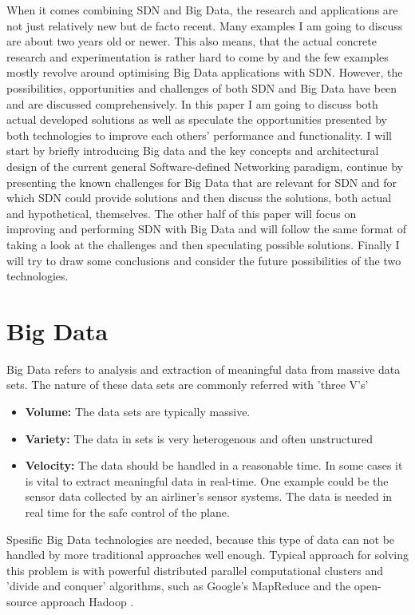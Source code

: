 \documentclass{acm_proc_article-sp}
\begin{document}
When it comes combining SDN and Big Data, the research and applications are not just relatively new but de facto recent. Many examples I am going to discuss are about two years old or newer. This also means, that the actual concrete research and experimentation is rather hard to come by and the few examples mostly revolve around optimising Big Data applications with SDN. However, the possibilities, opportunities and challenges of both SDN and Big Data have been and are discussed comprehensively. In this paper I am going to discuss both actual developed solutions as well as speculate the opportunities presented by both technologies to improve each others' performance and functionality. I will start by briefly introducing Big data and the key concepts and architectural design of the current general Software-defined Networking paradigm, continue by presenting the known challenges for Big Data that are relevant for SDN and for which SDN could provide solutions and then discuss the solutions, both actual and hypothetical, themselves. The other half of this paper will focus on improving and performing SDN with Big Data and will follow the same format of taking a look at the challenges and then speculating possible solutions. Finally I will try to draw some conclusions and consider the future possibilities of the two technologies. 

\section{Big Data}

Big Data refers to analysis and extraction of meaningful data from massive data sets. The nature of these data sets are commonly referred with 'three V's' \cite{Benjamins:2014:BDH:2611040.2611042}

\begin{itemize}
\item \textbf{Volume: } The data sets are typically massive.
\item \textbf{Variety: } The data in sets is very heterogenous and often unstructured
\item \textbf{Velocity: } The data should be handled in a reasonable time. In some cases it is vital to extract meaningful data in real-time. One example could be the sensor data collected by an airliner's sensor systems. The data is needed in real time for the safe control of the plane.
\end{itemize}

Spesific Big Data technologies are needed, because this type of data can not be handled by more traditional approaches well enough. Typical approach for solving this problem is with powerful distributed parallel computational clusters and 'divide and conquer' algorithms, such as Google's MapReduce \cite{Dean:2008:MSD:1327452.1327492} and the open-source approach Hadoop \cite{Hadoop}.
\end{document}
